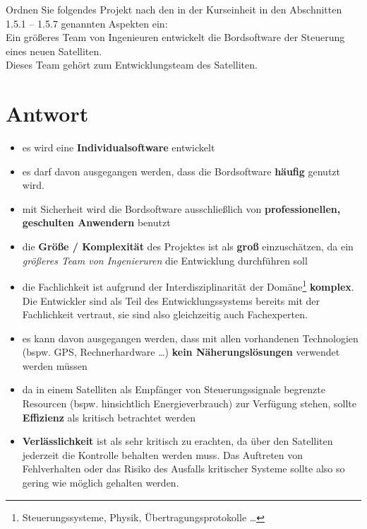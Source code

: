 Ordnen Sie folgendes Projekt nach den in der Kurseinheit in den Abschnitten 1.5.1 – 1.5.7 genannten Aspekten ein:\\

\noindent
Ein größeres Team von Ingenieuren entwickelt die Bordsoftware der Steuerung eines neuen Satelliten.\\
Dieses Team gehört zum Entwicklungsteam des Satelliten.


\section*{Antwort}

\begin{itemize}
    \item es wird eine \textbf{Individualsoftware} entwickelt
    \item es darf davon ausgegangen werden, dass die Bordsoftware \textbf{häufig} genutzt wird.
    \item mit Sicherheit wird die Bordsoftware ausschließlich von \textbf{professionellen, geschulten Anwendern} benutzt
    \item die \textbf{Größe / Komplexität} des Projektes ist als \textbf{groß} einzuschätzen, da ein \textit{größeres Team von Ingenieruren} die Entwicklung durchführen soll
    \item die Fachlichkeit ist aufgrund der Interdisziplinarität der Domäne\footnote{Steuerungssysteme, Physik, Übertragungsprotokolle \ldots} \textbf{komplex}.
    Die Entwickler sind als Teil des Entwicklungssystems bereits mit der Fachlichkeit vertraut, sie sind also gleichzeitig auch Fachexperten.
    \item es kann davon ausgegangen werden, dass mit allen vorhandenen Technologien (bspw. GPS, Rechnerhardware \ldots) \textbf{kein Näherungslösungen} verwendet werden müssen
    \item da in einem Satelliten als Empfänger von Steuerungssignale begrenzte Resourcen (bspw. hinsichtlich Energieverbrauch) zur Verfügung stehen, sollte \textbf{Effizienz} als kritisch betrachtet werden
    \item \textbf{Verlässlichkeit} ist als sehr kritisch zu erachten, da über den Satelliten jederzeit die Kontrolle behalten werden muss.
    Das Auftreten von Fehlverhalten oder das Risiko des Ausfalls kritischer Systeme sollte also so gering wie möglich gehalten werden.
\end{itemize}
